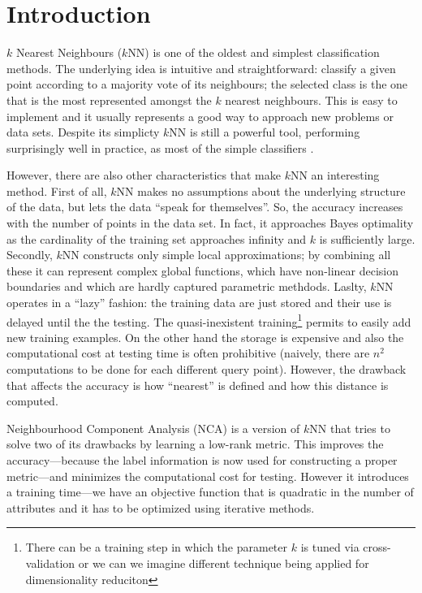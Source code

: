\chapter{Introduction} {
	  

	  $k$ Nearest Neighbours ($k$NN) is one of the oldest and simplest classification methods. The underlying idea is intuitive and straightforward: classify a given point according to a majority vote of its neighbours; the selected class is the one that is the most represented amongst the $k$ nearest neighbours. This is easy to implement and it usually represents a good way to approach new problems or data sets. Despite its simplicty $k$NN is still a powerful tool, performing surprisingly well in practice, as most of the simple classifiers \cite{holte1993}.

	  However, there are also other characteristics that make $k$NN an interesting method. First of all, $k$NN makes no assumptions about the underlying structure of the data, but lets the data ``speak for themselves''. So, the accuracy increases with the number of points in the data set. In fact, it approaches Bayes optimality as the cardinality of the training set approaches infinity and $k$ is sufficiently large. Secondly, $k$NN constructs only simple local approximations; by combining all these it can represent complex global functions, which have non-linear decision boundaries and which are hardly captured parametric methdods. Laslty, $k$NN operates in a ``lazy'' fashion: the training data are just stored and their use is delayed until the the testing. The quasi-inexistent training\footnote{There can be a training step in which the parameter $k$ is tuned via cross-validation or we can we imagine different technique being applied for dimensionality reduciton} permits to easily add new training examples. On the other hand the storage is expensive and also the computational cost at testing time is often prohibitive (naively, there are $n^2$ computations to be done for each different query point). However, the drawback that affects the accuracy is how ``nearest'' is defined and how this distance is computed. 
	  
	   Neighbourhood Component Analysis (NCA) \cite{goldberger2004} is a version of $k$NN that tries to solve two of its drawbacks by learning a low-rank metric. This improves the accuracy---because the label information is now used for constructing a proper metric---and minimizes the computational cost for testing. However it introduces a training time---we have an objective function that is quadratic in the number of attributes and it has to be optimized using iterative methods.
	  
}
